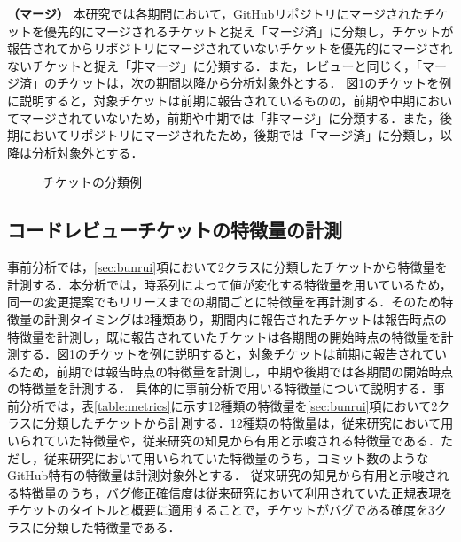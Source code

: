 \documentclass[11pt]{jreport}
\begin{document}
\textbf{（マージ）} 本研究では各期間において，GitHubリポジトリにマージされたチケットを優先的にマージされるチケットと捉え「マージ済」に分類し，チケットが報告されてからリポジトリにマージされていないチケットを優先的にマージされないチケットと捉え「非マージ」に分類する．また，レビューと同じく，「マージ済」のチケットは，次の期間以降から分析対象外とする．
図\ref{fig:labeling}のチケットを例に説明すると，対象チケットは前期に報告されているものの，前期や中期においてマージされていないため，前期や中期では「非マージ」に分類する．また，後期においてリポジトリにマージされたため，後期では「マージ済」に分類し，以降は分析対象外とする．

\begin{figure}[h]
\begin{center}
\caption{チケットの分類例}
\label{fig:labeling}
\end{center}
\end{figure}


\subsection{コードレビューチケットの特徴量の計測}\label{sec:metrics}
事前分析では，\ref{sec:bunrui}項において2クラスに分類したチケットから特徴量を計測する．本分析では，時系列によって値が変化する特徴量を用いているため，同一の変更提案でもリリースまでの期間ごとに特徴量を再計測する．そのため特徴量の計測タイミングは2種類あり，期間内に報告されたチケットは報告時点の特徴量を計測し，既に報告されていたチケットは各期間の開始時点の特徴量を計測する．図\ref{fig:labeling}のチケットを例に説明すると，対象チケットは前期に報告されているため，前期では報告時点の特徴量を計測し，中期や後期では各期間の開始時点の特徴量を計測する．
具体的に事前分析で用いる特徴量について説明する．事前分析では，表\ref{table:metrics}に示す12種類の特徴量を\ref{sec:bunrui}項において2クラスに分類したチケットから計測する．12種類の特徴量は，従来研究\cite{prioritizer}において用いられていた特徴量や，従来研究\cite{release_merge}\cite{review1}の知見から有用と示唆される特徴量である．ただし，従来研究\cite{prioritizer}において用いられていた特徴量のうち，コミット数のようなGitHub特有の特徴量は計測対象外とする．
従来研究\cite{release_merge}\cite{review1}の知見から有用と示唆される特徴量のうち，バグ修正確信度は従来研究\cite{bug}において利用されていた正規表現をチケットのタイトルと概要に適用することで，チケットがバグである確度を3クラスに分類した特徴量である．
\end{document}
